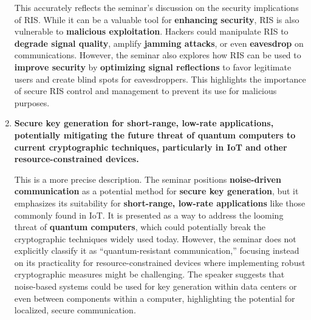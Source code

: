 \documentclass[
]{article}
\begin{document}
\begin{enumerate}
  This accurately reflects the seminar's discussion on the security
  implications of RIS. While it can be a valuable tool for
  \textbf{enhancing security}, RIS is also vulnerable to
  \textbf{malicious exploitation}. Hackers could manipulate RIS to
  \textbf{degrade signal quality}, amplify \textbf{jamming attacks}, or
  even \textbf{eavesdrop} on communications. However, the seminar also
  explores how RIS can be used to \textbf{improve security} by
  \textbf{optimizing signal reflections} to favor legitimate users and
  create blind spots for eavesdroppers. This highlights the importance
  of secure RIS control and management to prevent its use for malicious
  purposes.
\item
  \textbf{Secure key generation for short-range, low-rate applications,
  potentially mitigating the future threat of quantum computers to
  current cryptographic techniques, particularly in IoT and other
  resource-constrained devices.}

  This is a more precise description. The seminar positions
  \textbf{noise-driven communication} as a potential method for
  \textbf{secure key generation}, but it emphasizes its suitability for
  \textbf{short-range, low-rate applications} like those commonly found
  in IoT. It is presented as a way to address the looming threat of
  \textbf{quantum computers}, which could potentially break the
  cryptographic techniques widely used today. However, the seminar does
  not explicitly classify it as ``quantum-resistant communication,''
  focusing instead on its practicality for resource-constrained devices
  where implementing robust cryptographic measures might be challenging.
  The speaker suggests that noise-based systems could be used for key
  generation within data centers or even between components within a
  computer, highlighting the potential for localized, secure
  communication.
\end{enumerate}
\end{document}
